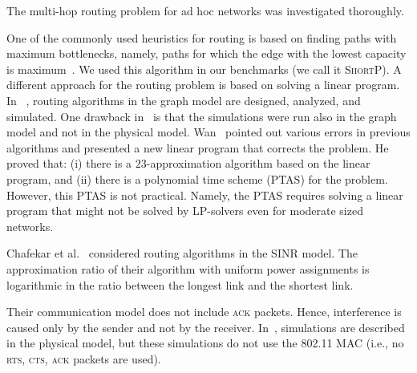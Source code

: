 \documentclass[12pt]{article}
\newenvironment{proof sketch}[1]{\noindent {\emph{Proof sketch of #1:}}}{\hfill \qed}
\newcommand{\algB}{\textsc{ShortP}}
\newcommand{\algS}{\algB}
\begin{document}
The multi-hop routing problem for ad hoc networks was investigated
thoroughly.

One of the commonly used heuristics for routing is based on finding
paths with maximum bottlenecks, namely, paths for which the edge with
the lowest capacity is maximum~\cite{draves2004routing}.  We used this
algorithm in our benchmarks (we call it \algS). A different approach
for the routing problem is based on solving a linear program.  In
~\cite{kumar2005algorithmic,jain2005impact,alicherry2005joint11},
routing algorithms in the graph model are designed, analyzed, and
simulated.  One drawback
in~\cite{kumar2005algorithmic,jain2005impact,alicherry2005joint11} is
that the simulations were run also in the graph model and not in the
physical model.  Wan~\cite{wan2009multiflows} pointed out various
errors in previous algorithms and presented a new linear program that
corrects the problem. He proved that: (i) there is a
$23$-approximation algorithm based on the linear program, and (ii)
there is a polynomial time scheme (PTAS) for the problem. However,
this PTAS is not practical.  Namely, the PTAS requires solving a
linear program that might not be solved by LP-solvers even for
moderate sized networks.

Chafekar et al.~\cite{ChafekarCapacity,chafekarPhD} considered routing
algorithms in the SINR model. The approximation ratio of their
algorithm with uniform power assignments is logarithmic in the ratio
between the longest link and the shortest link.

Their communication model does not include \textsc{ack} packets.
Hence, interference is caused only by the sender and not by the
receiver.  In~\cite{chafekarPhD}, simulations are described in the
physical model, but these simulations do not use the 802.11 MAC (i.e.,
no \textsc{rts, cts, ack} packets are used).
\end{document}
